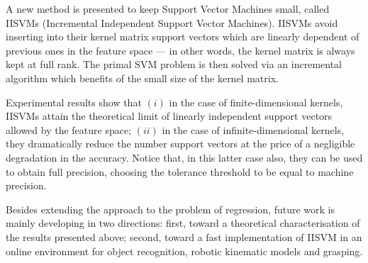 
A new method is presented to keep Support Vector Machines small,
called IISVMs (Incremental Independent Support Vector
Machines). IISVMs avoid inserting into their kernel matrix support
vectors which are linearly dependent of previous ones in the feature
space --- in other words, the kernel matrix is always kept at full
rank. The primal SVM problem is then solved via an incremental
algorithm which benefits of the small size of the kernel matrix.

Experimental results show that $(i)$ in the case of finite-dimensional
kernels, IISVMs attain the theoretical limit of linearly independent
support vectors allowed by the feature space; $(ii)$ in the case of
infinite-dimensional kernels, they dramatically reduce the number
support vectors at the price of a negligible degradation in the
accuracy. Notice that, in this latter case also, they can be used to
obtain full precision, choosing the tolerance threshold to be equal to
machine precision.

Besides extending the approach to the problem of regression, future
work is mainly developing in two directions: first, toward a
theoretical characterisation of the results presented above; second,
toward a fast implementation of IISVM in an online environment for
object recognition, robotic kinematic models and grasping.
